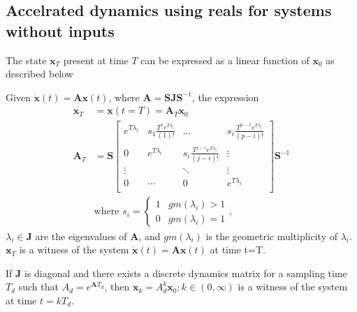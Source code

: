 \documentclass[sigconf]{llncs}
\newcommand{\mat}[1]{\boldsymbol{#1}}
\renewcommand{\vec}[1]{\boldsymbol{#1}}
\begin{document}
 \subsection{Accelrated dynamics using reals for systems without inputs}\label{sec:real_discrete_no_inputs}
 The state $\vec{x}_T$ present at time $T$ can be expressed as a linear function of $\vec{x}_0$ as described below
 \begin{theorem}
 Given $\dot{\vec{x}}(t)=\mat{A}\vec{x}(t)$, where $\mat{A}=\mat{S}\mat{J}\mat{S}^{-1}$, the expression
 \begin{align}
 \vec{x}_T&=\vec{x}(t=T)=\mat{A}_{T}\vec{x}_0\\
 \mat{A}_{T}&= \mat{S}
 \left [ \begin{array}{cccc}
 e^{T\lambda_1}  & s_1\frac{T^{1}e^{T\lambda_i}}{(1)!} & \hdots  & s_i\frac{T^{p-1}e^{T\lambda_i}}{(p-i)!} \\
0 & e^{T\lambda_i}  & s_i\frac{T^{j-i}e^{T\lambda_i}}{(j-i)!} & \vdots \\
\vdots & & \ddots & \vdots \\
0 & \cdots & 0  &e^{T\lambda_i} \\
\end{array} \right ]
 \mat{S}^{-1}
 \label{eq:continuous_tube_dyn}\\
 &\text{where } s_i=\left\{\begin{array}{cc}1&gm(\lambda_i)>1\\0&gm(\lambda_i)=1\end{array}\right.,\nonumber
 \end{align}
$\lambda_i \in \mat{J}$ are the eigenvalues of $\mat{A}$, and $gm(\lambda_i)$ is the geometric multiplicity of $\lambda_i$.  $\vec{x}_T$ is a witness of the system $\dot{\vec{x}}(t)=\mat{A}\vec{x}(t)$ at time t=T.
 \end{theorem}
 \begin{corollary}
 If $\mat{J}$ is diagonal and there exists a discrete dynamics matrix for a sampling time $T_d$ such that $A_d=e^{\mat{A} T_d}$, then $\vec{x}_k=A_d^k\vec{x}_0 : k \in (0,\infty)$ is a witness of the system at time $t=kT_d$.
 \end{corollary}
\end{document}
